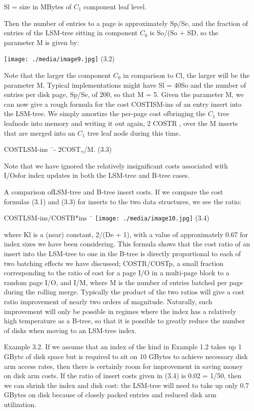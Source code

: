 \documentclass[a4paper,12pt,notitlepage,twoside,openright]{article}
\begin{document}
Sl = size in MBytes of \(C_1\) component leaf level.

Then the number of entries to a page is approximately Sp/Se, and the
fraction of entries of the LSM-tree sitting in component \(C_0\) is So/(So +
SD, so the parameter M is given by:


\texttt{[image: ./media/image9.jpg]}
(3.2)


Note that the larger the component \(C_0\) in comparison to Cl, the larger
will be the parameter M. Typical implementations might have Sl = 40So
and the number of entries per disk page, Sp/Se, of 200, so that M = 5.
Given the parameter M, we can now give a rough formula for the cost
COSTISM-ins of an entry insert into the LSM-tree. We simply amortize the
per-page cost ofbringing the \(C_1\) tree leafnode into memory and writing it
out again, 2 COSTR , over the M inserts that are merged into an \(C_1\) tree
leaf node during this time.


COSTLSM-ins ¯- 2COST„/M. (3.3)


Note that we have ignored the relatively insignificant costs associated
with I/Osfor index updates in both the LSM-tree and B-tree cases.

A comparison ofLSM-tree and B-tree insert costs. If we compare the cost
formulas (3.1) and (3.3) for inserts to the two data structures, we see
the ratio:


COSTLSM-ins/COSTB*ins ¯
\texttt{[image: ./media/image10.jpg]}
(3.4)


where Kl is a (near) constant, 2/(De + 1), with a value of approximately
0.67 for index sizes we have been considering. This formula shows that
the cost ratio of an insert into the LSM-tree to one in the B-tree is
directly proportional to each of two batching effects we have discussed;
COSTR/COSTp, a small fraction corresponding to the ratio of cost for a
page I/O in a multi-page block to a random page I/O, and I/M, where M is
the number of entries batched per page during the rolling merge.
Typically the product of the two ratios will give a cost ratio
improvement of nearly two orders of magnitude. Naturally, such
improvement will only be possible in regimes where the index has a
relatively high temperature as a B-tree, so that it is possible to
greatly reduce the number of disks when moving to an LSM-tree index.

Example 3.2. If we assume that an index of the kind in Example 1.2 takes
up 1 GByte of disk space but is required to sit on 10 GBytes to achieve
necessary disk arm access rates, then there is certainly room for
improvement in saving money on disk arm costs. If the ratio of insert
costs given in (3.4) is 0.02 = 1/50, then we can shrink the index and
disk cost: the LSM-tree will need to take up only 0.7 GBytes on disk
because of closely packed entries and reduced disk arm utilization.
\end{document}
